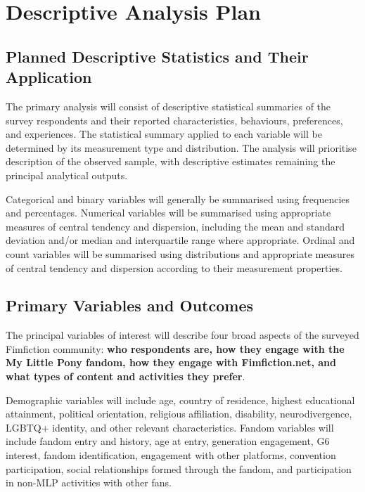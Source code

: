 \section{Descriptive Analysis Plan}

\subsection{Planned Descriptive Statistics and Their Application}

The primary analysis will consist of descriptive statistical summaries of the survey respondents and their reported characteristics, behaviours, preferences, and experiences. The statistical summary applied to each variable will be determined by its measurement type and distribution. The analysis will prioritise description of the observed sample, with descriptive estimates remaining the principal analytical outputs.

Categorical and binary variables will generally be summarised using frequencies and percentages. Numerical variables will be summarised using appropriate measures of central tendency and dispersion, including the mean and standard deviation and/or median and interquartile range where appropriate. Ordinal and count variables will be summarised using distributions and appropriate measures of central tendency and dispersion according to their measurement properties.


\subsection{Primary Variables and Outcomes}

The principal variables of interest will describe four broad aspects of the surveyed Fimfiction community: \textbf{who respondents are, how they engage with the My Little Pony fandom, how they engage with Fimfiction.net, and what types of content and activities they prefer}.

Demographic variables will include age, country of residence, highest educational attainment, political orientation, religious affiliation, disability, neurodivergence, LGBTQ+ identity, and other relevant characteristics. Fandom variables will include fandom entry and history, age at entry, generation engagement, G6 interest, fandom identification, engagement with other platforms, convention participation, social relationships formed through the fandom, and participation in non-MLP activities with other fans.

